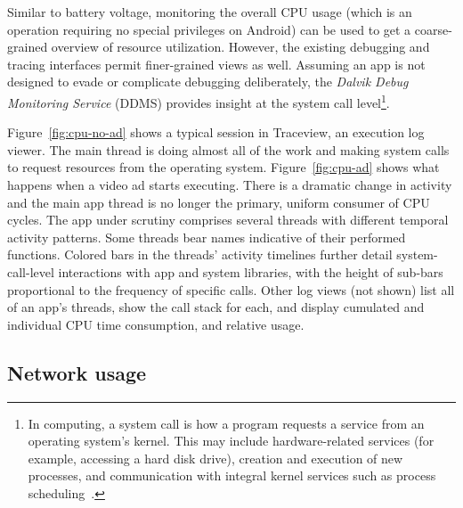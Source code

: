 Similar to battery voltage, monitoring the overall CPU usage 
(which is an operation requiring no special privileges on Android) 
can be used to get a coarse-grained overview of resource utilization. 
However, the existing debugging and tracing interfaces permit 
finer-grained views as well. Assuming an app is not designed to 
evade or complicate debugging deliberately, the 
\textit{Dalvik Debug Monitoring Service} (DDMS) 
provides insight at the system call level\footnote{In computing, a system call is how a program requests a service from an operating system's kernel. This may include hardware-related services (for example, accessing a hard disk drive), creation and execution of new processes, and communication with integral kernel services such as process scheduling~\cite{syscall}.}.  

Figure~\ref{fig:cpu-no-ad} shows a typical  
session in Traceview, an execution log viewer.  The main thread is doing almost all of the work
and making system calls to request resources from the operating system.  Figure~\ref{fig:cpu-ad} shows what happens when a video ad starts 
executing.  There is a dramatic change in activity and the main app thread is no longer 
the primary, uniform consumer of CPU cycles.
The app under scrutiny comprises several threads with different 
temporal activity patterns. Some threads bear names indicative 
of their performed functions. Colored bars in the threads' activity 
timelines further detail system-call-level interactions with app and system 
libraries, with the height of sub-bars proportional to the frequency 
of specific calls.  
Other log views (not shown) list all of an app's threads, show the 
call stack for each, and display cumulated and individual CPU time 
consumption, and relative usage.



\subsection{Network usage}

